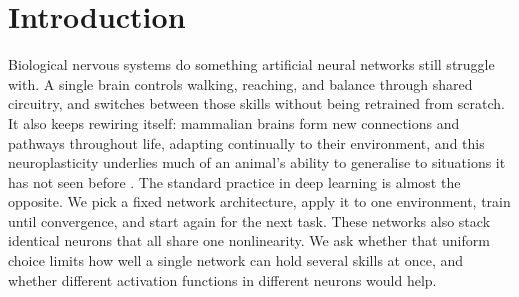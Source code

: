 \documentclass[12pt]{article}
\newcommand{\revTerm}[2]{#2}
\newcommand{\revMeta}[2]{#2}
\begin{document}
\begin{abstract}
Our main result is a null result. Median fitness was 0.184 (NEAT), 0.208 (HA-NEAT), and 0.199 (ablation), with no difference across conditions (Kruskal--Wallis $H = 1.48$, $p = 0.476$). The design rules out only effects of Cohen's $d \geq 0.74$, so smaller differences could have gone undetected. HA-NEAT champions drew on the \revTerm{T-01}{full activation set}, and $\tanh$ was their \emph{least} common hidden activation at 11\%. We found one structural signal: the ablation's champions are more compact than NEAT's ($p = 0.030$). That effect appears in the condition with no activation diversity at all, which points to the historical markers that HA-NEAT reassigns after an activation change as the likely cause, and away from heterogeneity. One caveat limits these conclusions. Walker2D binds the minimum for 83--97\% of champions while Hopper saturates near 0.34 normalised, so the objective degenerated toward single-task Walker2D optimisation and applied less multi-task pressure than the design intended.
\end{abstract}

\newpage

\tableofcontents
\revMeta{M-01}{}%
\revMeta{M-02}{}%

\bigskip

\newpage

\newpage

\section{Introduction}
\label{sec:introduction}

Biological nervous systems do something artificial neural networks still struggle with.
A single brain controls walking, reaching, and balance through shared circuitry, and switches between those skills without being retrained from scratch.
It also keeps rewiring itself: mammalian brains form new connections and pathways throughout life, adapting continually to their environment, and this neuroplasticity underlies much of an animal's ability to generalise to situations it has not seen before \parencite{pascual-leone_plastic_2005}.
The standard practice in deep learning is almost the opposite.
We pick a fixed network architecture, apply it to one environment, train until convergence, and start again for the next task.
These networks also stack identical neurons that all share one nonlinearity.
We ask whether that uniform choice limits how well a single network can hold several skills at once, and whether different activation functions in different neurons would help.
\end{document}
